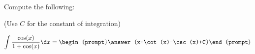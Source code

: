 \documentclass{ximera}
\author{Jim Talamo}
\begin{document}
\begin{exercise}
Compute the following:

\begin{prompt} (Use $C$ for the constant of integration) \end{prompt}

\[
\int \frac{\cos(x)}{1+\cos(x)} \d x =
\begin{prompt}\answer{x+\cot(x)-\csc(x)+C}\end{prompt} \\
\]

\end{exercise}
\end{document}
